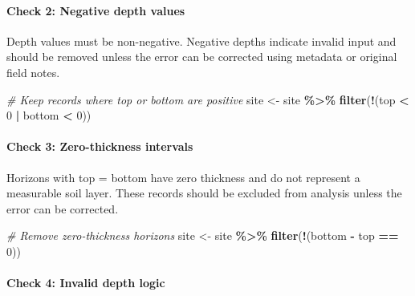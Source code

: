 \documentclass[
  10pt,
  b5paper,
  oneside]{book}
\newenvironment{Shaded}{\begin{snugshade}}{\end{snugshade}}
\newcommand{\CommentTok}[1]{\textcolor[rgb]{0.56,0.35,0.01}{\textit{#1}}}
\newcommand{\DecValTok}[1]{\textcolor[rgb]{0.00,0.00,0.81}{#1}}
\newcommand{\FunctionTok}[1]{\textcolor[rgb]{0.13,0.29,0.53}{\textbf{#1}}}
\newcommand{\NormalTok}[1]{#1}
\newcommand{\OtherTok}[1]{\textcolor[rgb]{0.56,0.35,0.01}{#1}}
\newcommand{\SpecialCharTok}[1]{\textcolor[rgb]{0.81,0.36,0.00}{\textbf{#1}}}
\begin{document}
\paragraph*{Check 2: Negative depth values}\label{check-2-negative-depth-values}

Depth values must be non-negative. Negative depths indicate invalid input and should be removed unless the error can be corrected using metadata or original field notes.

\begin{Shaded}
\begin{Highlighting}[]
\CommentTok{\# Keep records where \textasciigrave{}top\textasciigrave{} or \textasciigrave{}bottom\textasciigrave{} are positive}
\NormalTok{  site }\OtherTok{\textless{}{-}}\NormalTok{ site }\SpecialCharTok{\%\textgreater{}\%}
    \FunctionTok{filter}\NormalTok{(}\SpecialCharTok{!}\NormalTok{(top }\SpecialCharTok{\textless{}} \DecValTok{0} \SpecialCharTok{|}\NormalTok{ bottom }\SpecialCharTok{\textless{}} \DecValTok{0}\NormalTok{))}
\end{Highlighting}
\end{Shaded}

\paragraph*{Check 3: Zero-thickness intervals}\label{check-3-zero-thickness-intervals}

Horizons with top = bottom have zero thickness and do not represent a measurable soil layer. These records should be excluded from analysis unless the error can be corrected.

\begin{Shaded}
\begin{Highlighting}[]
\CommentTok{\# Remove zero{-}thickness horizons}
\NormalTok{  site }\OtherTok{\textless{}{-}}\NormalTok{ site }\SpecialCharTok{\%\textgreater{}\%}
    \FunctionTok{filter}\NormalTok{(}\SpecialCharTok{!}\NormalTok{(bottom }\SpecialCharTok{{-}}\NormalTok{ top }\SpecialCharTok{==} \DecValTok{0}\NormalTok{))}
\end{Highlighting}
\end{Shaded}

\paragraph*{Check 4: Invalid depth logic}\label{check-4-invalid-depth-logic}
\end{document}
